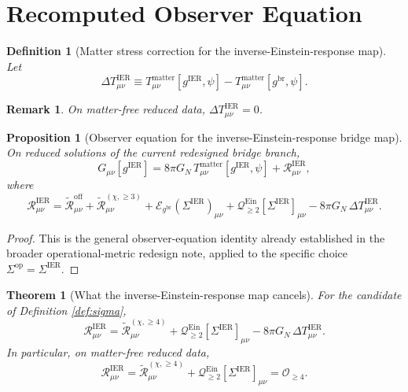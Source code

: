\documentclass[11pt]{article}
\newcommand{\ReBridge}{g^{\mathrm{br}}}
\newcommand{\OpMetricIER}{g^{\mathrm{IER}}}
\newcommand{\SigmaIER}{\Sigma^{\mathrm{IER}}}
\newcommand{\ReOff}{\widetilde{\mathcal R}_{\mu\nu}^{\mathrm{off}}}
\newcommand{\ReLong}{\widetilde{\mathcal R}_{\mu\nu}^{(\chi,\ge 3)}}
\newcommand{\ReLongFour}{\widetilde{\mathcal R}_{\mu\nu}^{(\chi,\ge 4)}}
\newcommand{\DeltaTIER}{\Delta T_{\mu\nu}^{\mathrm{IER}}}
\newcommand{\EinLin}{\mathcal E_{\ReBridge}}
\newcommand{\EinQuad}{\mathcal Q_{\ge 2}^{\mathrm{Ein}}}
\newtheorem{definition}{Definition}
\newtheorem{proposition}{Proposition}
\newtheorem{remark}{Remark}
\newtheorem{theorem}{Theorem}
\begin{document}
\section{Recomputed Observer Equation}

\begin{definition}[Matter stress correction for the inverse-Einstein-response map]
\label{def:deltat}
Let
\begin{equation}
\DeltaTIER
\equiv
T_{\mu\nu}^{\mathrm{matter}}[\OpMetricIER,\psi]
-T_{\mu\nu}^{\mathrm{matter}}[\ReBridge,\psi].
\label{eq:deltat}
\end{equation}
\end{definition}

\begin{remark}
On matter-free reduced data, \(\DeltaTIER=0\).
\end{remark}

\begin{proposition}[Observer equation for the inverse-Einstein-response bridge map]
\label{prop:observer}
On reduced solutions of the current redesigned bridge branch,
\begin{equation}
G_{\mu\nu}[\OpMetricIER]
=
8\pi G_N\,T_{\mu\nu}^{\mathrm{matter}}[\OpMetricIER,\psi]
+\mathcal R_{\mu\nu}^{\mathrm{IER}},
\label{eq:observer}
\end{equation}
where
\begin{equation}
\mathcal R_{\mu\nu}^{\mathrm{IER}}
=
\ReOff+\ReLong
+\EinLin(\SigmaIER)_{\mu\nu}
+\EinQuad[\SigmaIER]_{\mu\nu}
-8\pi G_N\,\DeltaTIER.
\label{eq:observer2}
\end{equation}
\end{proposition}

\begin{proof}
This is the general observer-equation identity already established in the broader operational-metric redesign note, applied to the specific choice \(\Sigma^{\mathrm{op}}=\SigmaIER\).
\end{proof}

\begin{theorem}[What the inverse-Einstein-response map cancels]
\label{thm:cancels}
For the candidate of Definition \ref{def:sigma},
\begin{equation}
\mathcal R_{\mu\nu}^{\mathrm{IER}}
=
\ReLongFour
+\EinQuad[\SigmaIER]_{\mu\nu}
-8\pi G_N\,\DeltaTIER.
\label{eq:reduced}
\end{equation}
In particular, on matter-free reduced data,
\begin{equation}
\mathcal R_{\mu\nu}^{\mathrm{IER}}
=
\ReLongFour
+\EinQuad[\SigmaIER]_{\mu\nu}
=
\mathcal O_{\ge 4}.
\label{eq:matterfree}
\end{equation}
\end{theorem}
\end{document}
